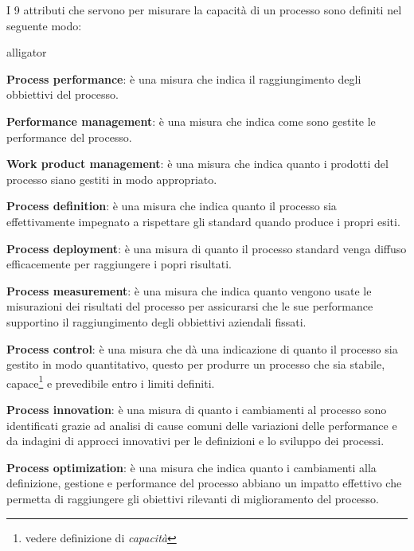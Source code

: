 I 9 attributi che servono per misurare la capacità di un processo sono definiti nel seguente modo:
\begin{labeling}{alligator}
	\item \textbf{Process performance}:  è una misura che indica il raggiungimento degli obbiettivi del processo.
	\item \textbf{Performance management}: è una misura che indica come sono gestite le performance del processo.%
	\item \textbf{Work product management}: è una misura che indica quanto i prodotti del processo siano gestiti in modo appropriato.
	\item \textbf{Process definition}: è una misura che indica quanto il processo sia effettivamente impegnato a rispettare gli standard quando produce i propri esiti.
	\item \textbf{Process deployment}: è una misura di quanto il processo standard venga diffuso efficacemente per raggiungere i popri risultati.%
	\item \textbf{Process measurement}:  è una misura che indica quanto vengono usate le misurazioni dei risultati  del processo per assicurarsi che le sue  performance supportino il raggiungimento degli obbiettivi aziendali fissati.
	\item \textbf{Process control}:  è una misura che dà una indicazione di quanto il processo sia gestito in modo quantitativo, questo per produrre un processo che sia stabile, capace\footnote{vedere definizione di \emph{capacità}} e prevedibile entro i limiti definiti.%
	\item \textbf{Process innovation}: è una misura di quanto i cambiamenti al processo sono identificati grazie ad analisi di cause comuni delle variazioni delle performance e da indagini di approcci innovativi per le definizioni e lo sviluppo dei processi.%
	\item \textbf{Process optimization}: è una misura che indica quanto i cambiamenti alla definizione, gestione e performance del processo abbiano un impatto effettivo che permetta di raggiungere gli obiettivi rilevanti di miglioramento del processo.%
\end{labeling}

